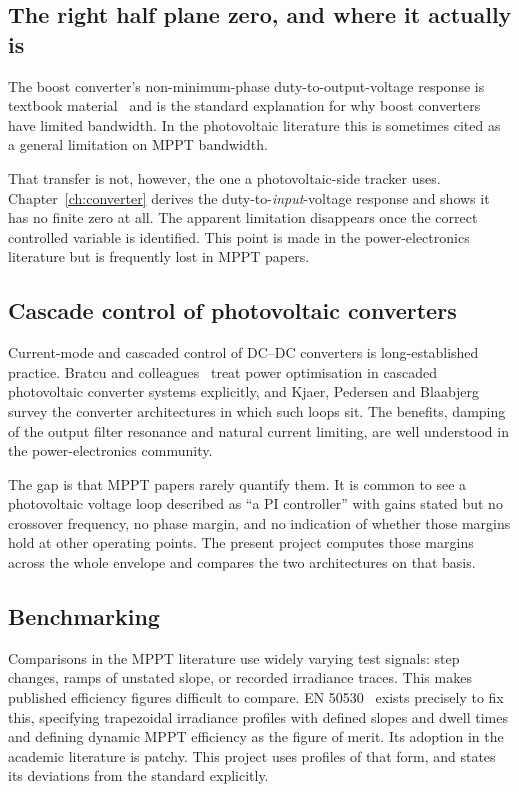 \subsection{The right half plane zero, and where it actually is}

The boost converter's non-minimum-phase duty-to-output-voltage response is
textbook material~\cite{erickson} and is the standard explanation for why boost
converters have limited bandwidth. In the photovoltaic literature this is
sometimes cited as a general limitation on MPPT bandwidth.

That transfer is not, however, the one a photovoltaic-side tracker uses.
Chapter~\ref{ch:converter} derives the duty-to-\emph{input}-voltage response and
shows it has no finite zero at all. The apparent limitation disappears once the
correct controlled variable is identified. This point is made in the
power-electronics literature but is frequently lost in MPPT papers.

\subsection{Cascade control of photovoltaic converters}

Current-mode and cascaded control of DC--DC converters is long-established
practice. Bratcu and colleagues~\cite{bratcu} treat power optimisation in
cascaded photovoltaic converter systems explicitly, and Kjaer, Pedersen and
Blaabjerg~\cite{kjaer} survey the converter architectures in which such loops
sit. The benefits, damping of the output filter resonance and natural current
limiting, are well understood in the power-electronics community.

The gap is that MPPT papers rarely quantify them. It is common to see a
photovoltaic voltage loop described as ``a PI controller'' with gains stated but
no crossover frequency, no phase margin, and no indication of whether those
margins hold at other operating points. The present project computes those
margins across the whole envelope and compares the two architectures on that
basis.

\subsection{Benchmarking}

Comparisons in the MPPT literature use widely varying test signals: step
changes, ramps of unstated slope, or recorded irradiance traces. This makes
published efficiency figures difficult to compare. EN 50530~\cite{en50530}
exists precisely to fix this, specifying trapezoidal irradiance profiles with
defined slopes and dwell times and defining dynamic MPPT efficiency as the
figure of merit. Its adoption in the academic literature is patchy. This project
uses profiles of that form, and states its deviations from the standard
explicitly.

